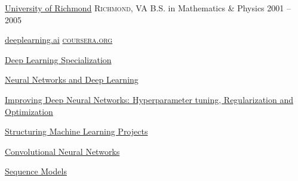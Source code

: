 \documentclass[10pt,a4paper]{article}
\begin{document}
\headedsection
  {\href{http://www.richmond.edu/}{University of Richmond}}
  {\textsc{Richmond, VA}} {%
  \headedsubsection
    {B.S. in Mathematics \& Physics}
    {2001 -- 2005}
    {}
}


\spacedhrule{2.0em}{0.2em}



  \headedsection
    {\href{https://www.deeplearning.ai/}{deeplearning.ai}}
    {\href{https://www.coursera.org/}{\textsc{coursera.org}}} {

      \headedsubsection
        {\href{https://www.coursera.org/account/accomplishments/specialization/9WCEB5PYL6VT}{Deep Learning Specialization}}
        {}

      \headedsubsection
        {\href{https://www.coursera.org/account/accomplishments/verify/JSDREA8QF6XG}{Neural Networks and Deep Learning}}
        {}

      \headedsubsection
        {\href{https://www.coursera.org/account/accomplishments/verify/8FCH622WF97A}{Improving Deep Neural Networks: Hyperparameter tuning, Regularization and Optimization}}
        {}

      \headedsubsection
        {\href{https://www.coursera.org/account/accomplishments/verify/UXZBYZQKAEU9}{Structuring Machine Learning Projects}}
        {}

      \headedsubsection
        {\href{https://www.coursera.org/account/accomplishments/verify/GNUR9KQXTNPS}{Convolutional Neural Networks}}
        {}

      \headedsubsection
        {\href{https://www.coursera.org/account/accomplishments/verify/RE53JG7A9ZKV}{Sequence Models}}
        {}

    }


\spacedhrule{2.0em}{0.2em}

\end{document}
